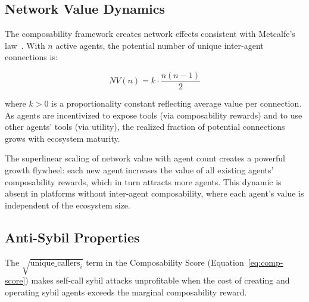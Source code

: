\subsection{Network Value Dynamics}
\label{subsec:network-value}

The composability framework creates network effects consistent with
Metcalfe's law~\citep{metcalfe2013}. With $n$ active agents, the potential
number of unique inter-agent connections is:

\begin{equation}
  NV(n) = k \cdot \frac{n(n-1)}{2}
  \label{eq:metcalfe}
\end{equation}

where $k > 0$ is a proportionality constant reflecting average value per
connection. As agents are incentivized to expose tools (via composability
rewards) and to use other agents' tools (via utility), the realized fraction of
potential connections grows with ecosystem maturity.

\begin{remark}
The superlinear scaling of network value with agent count creates a powerful
growth flywheel: each new agent increases the value of all existing agents'
composability rewards, which in turn attracts more agents. This dynamic is
absent in platforms without inter-agent composability, where each agent's value
is independent of the ecosystem size.
\end{remark}

\subsection{Anti-Sybil Properties}
\label{subsec:anti-sybil}

\begin{proposition}
\label{prop:sybil}
The $\sqrt{\text{unique\_callers}_i}$ term in the Composability Score
(Equation~\eqref{eq:comp-score}) makes self-call sybil attacks
unprofitable when the cost of creating and operating sybil agents exceeds
the marginal composability reward.
\end{proposition}

